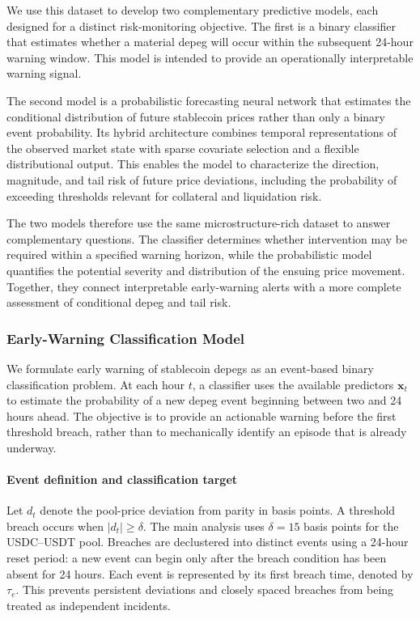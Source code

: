\documentclass[a4paper,fleqn]{cas-sc}
\begin{document}
We use this dataset to develop two complementary predictive models, each designed for a distinct risk-monitoring objective. The first is a binary classifier that estimates whether a material depeg will occur within the subsequent 24-hour warning window. This model is intended to provide an operationally interpretable warning signal.

The second model is a probabilistic forecasting neural network that estimates the conditional distribution of future stablecoin prices rather than only a binary event probability. Its hybrid architecture combines temporal representations of the observed market state with sparse covariate selection and a flexible distributional output. This enables the model to characterize the direction, magnitude, and tail risk of future price deviations, including the probability of exceeding thresholds relevant for collateral and liquidation risk.

The two models therefore use the same microstructure-rich dataset to answer complementary questions. The classifier determines whether intervention may be required within a specified warning horizon, while the probabilistic model quantifies the potential severity and distribution of the ensuing price movement. Together, they connect interpretable early-warning alerts with a more complete assessment of conditional depeg and tail risk.


\subsubsection{Early-Warning Classification Model}
\label{sec:approach_classifier}

We formulate early warning of stablecoin depegs as an event-based binary classification problem. At each hour $t$, a classifier uses the available predictors $\mathbf{x}_t$ to estimate the probability of a new depeg event beginning between two and 24 hours ahead. The objective is to provide an actionable warning before the first threshold breach, rather than to mechanically identify an episode that is already underway.

\paragraph{Event definition and classification target}

Let $d_t$ denote the pool-price deviation from parity in basis points. A threshold breach occurs when $|d_t| \geq \delta$. The main analysis uses $\delta=15$ basis points for the USDC--USDT pool. Breaches are declustered into distinct events using a 24-hour reset period: a new event can begin only after the breach condition has been absent for 24 hours. Each event is represented by its first breach time, denoted by $\tau_e$. This prevents persistent deviations and closely spaced breaches from being treated as independent incidents.
\end{document}
